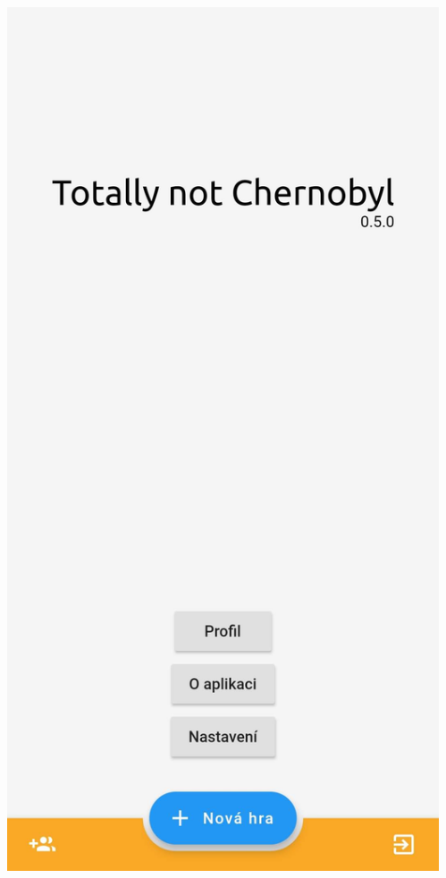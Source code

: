 \documentclass[czech,aspectratio=169]{beamer}
\begin{document}
\begin{frame}
\begin{columns}
\begin{column}{.25\textwidth}
        \begin{center}
          \includegraphics[width=.9\textwidth]{assets/slides/screen-a2}
        \end{center}
      \end{column} 
      \begin{column}{.25\textwidth}
        \begin{center}

\end{center}
\end{column}
\end{columns}
\end{frame}
\end{document}
